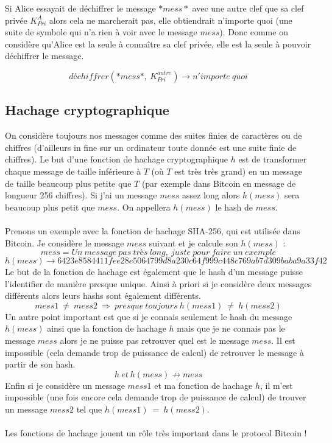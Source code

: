 \documentclass[11pt,a4paper]{article}
\begin{document}
Si Alice essayait de déchiffrer le message $*mess*$ avec une autre clef que sa clef privée $K_{Pri}^{A}$ alors cela ne marcherait pas, elle obtiendrait n'importe quoi (une suite de symbole qui n'a rien à voir avec le message $mess$). Donc comme on considère qu'Alice est la seule à connaître sa clef privée, elle est la seule à pouvoir déchiffrer le message.

$$déchiffrer(*mess*, ~K_{Pri}^{autre}) \rightarrow n'importe~quoi$$

\subsection{Hachage cryptographique}

On considère toujours nos messages comme des suites finies de caractères ou de chiffres (d'ailleurs in fine sur un ordinateur toute donnée est une suite finie de chiffres). Le but d'une fonction de hachage cryptographique $h$ est de transformer chaque message de taille inférieure à $T$ (où $T$ est très très grand) en un message de taille beaucoup plus petite que $T$ (par exemple dans Bitcoin en message de longueur 256 chiffres). Si j'ai un message $mess$ assez long alors $h(mess)$ sera beaucoup plus petit que $mess$. On appellera $h(mess)$ le hash de $mess$. \\\\
Prenons un exemple avec la fonction de hachage SHA-256, qui est utilisée dans Bitcoin. Je considère le message $mess$ suivant et je calcule son $h(mess)$ : 
$$mess = Un~message~pas~très ~long, ~juste ~pour ~faire ~un ~exemple $$
$$h(mess) \rightarrow 6423e8584411fee28e5064799d8a230c64f999c448c769ab7d309baba9a33f42$$
Le but de la fonction de hachage est également que le hash d'un message puisse l'identifier de manière presque unique. Ainsi à priori si je considère deux messages différents alors leurs hashs sont également différents.  
$$mess1~ \neq ~mess2~ \Rightarrow ~presque~ toujours~ h(mess1)~ \neq ~h(mess2)$$
Un autre point important est que si je connais seulement le hash du message $h(mess)$ ainsi que la fonction de hachage $h$ mais que je ne connais pas le message $mess$ alors je ne puisse pas retrouver quel est le message $mess$. Il est impossible (cela demande trop de puissance de calcul) de retrouver le message à partir de son hash.
$$ h~ et ~h(mess) \nrightarrow mess$$
Enfin si je considère un message $mess1$ et ma fonction de hachage $h$, il m'est impossible (une fois encore cela demande trop de puissance de calcul) de trouver un message $mess2$ tel que $h(mess1) ~=~ h(mess2)$.\\\\
Les fonctions de hachage jouent un rôle très important dans le protocol Bitcoin !
\end{document}
